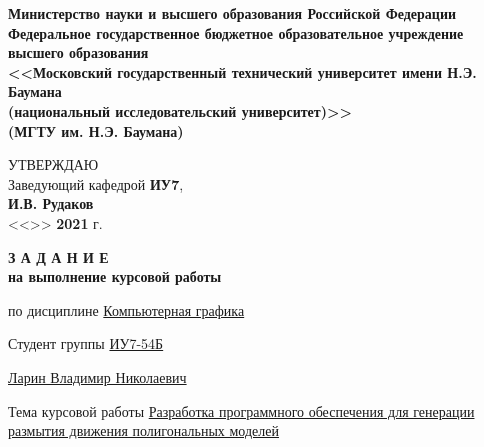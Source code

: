 

\thispagestyle{empty}
\begin{center}
    \fontsize{11pt}{0.3\baselineskip}\selectfont \textbf{Министерство науки и высшего образования Российской Федерации \\ Федеральное государственное бюджетное образовательное учреждение \\ высшего образования \\ <<Московский государственный технический университет имени Н.Э. Баумана \\ (национальный исследовательский университет)>> \\ (МГТУ им. Н.Э. Баумана)}
    \fontsize{11pt}{0.3\baselineskip}\selectfont
    \noindent \makebox[\linewidth]{\rule{\textwidth}{4pt}} \makebox[\linewidth]{\rule{\textwidth}{1pt}}
\end{center}
\begin{flushright}
    \fontsize{11pt}{0.5\baselineskip}\selectfont УТВЕРЖДАЮ \\ Заведующий кафедрой \textbf{ИУ7}, \\ \textbf{\hspace*{2.5cm}} \uline{\hspace*{2cm}} \textbf{И.В. Рудаков} \\ <<\uline{\hspace*{1cm}}>> \uline{\hspace*{2.5cm}} \textbf{2021} г.
\end{flushright}

\vfill

\begin{center}
    \fontsize{18pt}{0.6\baselineskip}\selectfont \textbf{З А Д А Н И Е}\\
    \fontsize{16pt}{0.6\baselineskip}\selectfont \textbf{на выполнение курсовой работы}
\end{center}

\normalsize

\begingroup
\fontsize{11pt}{0.5\baselineskip}\selectfont
\setlength{\parskip}{0.1em}
\setlength{\parindent}{0em}
по дисциплине \uline{\hfill Компьютерная графика \hfill}

Студент группы \uline{\hfill ИУ7-54Б \hfill}

\uline{\hfill Ларин Владимир Николаевич \hfill}

Тема курсовой работы \uline{Разработка   программного   обеспечения   для генерации размытия движения полигональных моделей \hfill}

